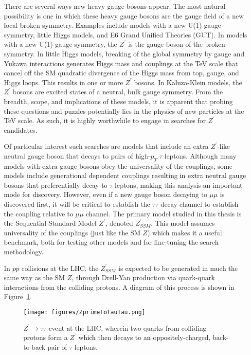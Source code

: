 There are several ways new heavy gauge bosons appear. The most natural possibility is one in which these heavy gauge bosons are the gauge field of a new local broken symmetry. Examples include models with a new U(1) gauge symmetry, little Higgs models, and E6 Grand Unified Theories (GUT). In models with a new U(1) gauge symmetry, the $Z^\prime$ is the gauge boson of the broken symmetry. In little Higgs models, breaking of the global symmetry by gauge and Yukawa interactions generates Higgs mass and couplings at the TeV scale that cancel off the SM quadratic divergence of the Higgs mass from top, gauge, and Higgs loops. This results in one or more $Z^\prime$ bosons. In Kaluza-Klein models, the $Z^\prime$ bosons are excited states of a neutral, bulk gauge symmetry. From the breadth, scope, and implications of these models, it is apparent that probing these questions and puzzles potentially lies in the physics of new
particles at the TeV scale. As such, it is highly worthwhile to engage in searches for $Z^\prime$ candidates.

Of particular interest such searches are models that include an extra $Z^\prime$-like neutral gauge boson that decays to pairs of high-$p_{T}$ $\tau$ leptons. Although many models with extra gauge bosons obey the universality of the couplings, some models include generational dependent couplings resulting in extra neutral gauge bosons that preferentially decay to $\tau$ leptons, making this analysis an important mode for discovery. However, even if a new gauge boson decaying to $\mu\mu$ is discovered first, it will be critical to establish the $\tau\tau$ decay channel to establish the coupling relative to $\mu\mu$ channel. The primary model studied in this thesis is the Sequential Standard Model $Z^\prime$, denoted $Z^{\prime}_{SSM}$. This model assumes universality of the couplings (just like the SM $Z$) which makes it a useful benchmark, both for testing other models and for fine-tuning the search methodology.

In $pp$ collisions at the LHC, the $Z^\prime_{SSM}$ is expected to be generated in much the same way as the SM $Z$, through Drell-Yan production via quark-quark interactions from the colliding protons. A diagram of this process is shown in Figure~\ref{fig:ZprimeToTauTau}.

\begin{figure}
\centering
  \texttt{[image: figures/ZprimeToTauTau.png]}
  \caption{\label{fig:ZprimeToTauTau} $Z^\prime \to \tau\tau$ event at the LHC, wherein two quarks from colliding protons form a $Z^\prime$ which then decays to an oppositely-charged, back-to-back pair of $\tau$ leptons.}
\end{figure}

